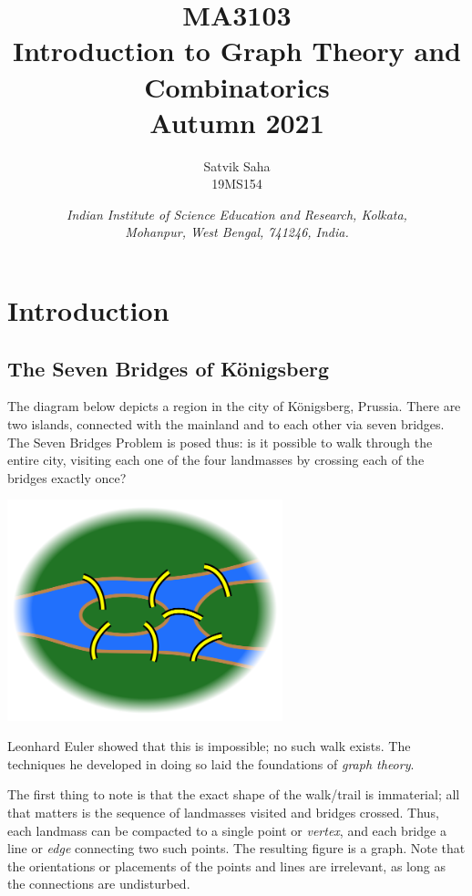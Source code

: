 \documentclass[11pt]{article}
\title{
    \Large\textsc{MA3103} \\
    \Huge \textbf{Introduction to Graph Theory and Combinatorics} \\
    \vspace{5pt}
    \Large{Autumn 2021}
}
\author{
    \large Satvik Saha
    \\\textsc{\small 19MS154}
}
\date{\normalsize
    \textit{Indian Institute of Science Education and Research, Kolkata, \\
    Mohanpur, West Bengal, 741246, India.} \\
}
\theoremstyle{definition}
\theoremstyle{remark}
\numberwithin{equation}{section}
\begin{document}
    \maketitle

    \tableofcontents

    \section{Introduction}
    
    \subsection{The Seven Bridges of K\"onigsberg}
    
    The diagram below depicts a region in the city of K\"onigsberg, Prussia. There
    are two islands, connected with the mainland and to each other via seven bridges.
    The Seven Bridges Problem is posed thus: is it possible to walk through the
    entire city, visiting each one of the four landmasses by crossing each of the
    bridges exactly once?

    \begin{center}
        \includegraphics[width=0.6\textwidth]{7_bridges.png}
    \end{center}

    Leonhard Euler showed that this is impossible; no such walk exists. The
    techniques he developed in doing so laid the foundations of \textit{graph
    theory}.

    The first thing to note is that the exact shape of the walk/trail is immaterial;
    all that matters is the sequence of landmasses visited and bridges crossed. Thus,
    each landmass can be compacted to a single point or \textit{vertex}, and each
    bridge a line or \textit{edge} connecting two such points. The resulting figure
    is a graph. Note that the orientations or placements of the points and lines are
    irrelevant, as long as the connections are undisturbed.
\end{document}

